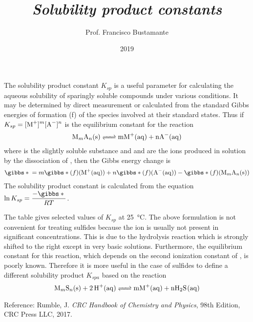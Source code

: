 \documentclass[a4paper, 10pt]{article}
\author{Prof. Francisco Bustamante}
\title{\textit{Solubility product constants}}
\date{2019}
\begin{document}
\small

\twocolumn

The solubility product constant $K_{sp}$ is a useful parameter for calculating the aqueous solubility of sparingly soluble compounds under various conditions. It may be determined by direct measurement or calculated from the standard Gibbs energies of formation \gibbs*(f){} of the species involved at their standard states. Thus if $K_{sp} = \ce{[M+]^m[A^-]^n}$ is the equilibrium constant for the reaction
\begin{align*}
    \ce{M_mA_n(s) <=> mM+(aq) + nA-(aq)}
\end{align*}
where  is the slightly soluble substance and  and  are the ions produced in solution by the dissociation of , then the Gibbs energy change is
\begin{align*}
    \gibbs*{} = m\gibbs*(f){}(\ce{M+(aq)}) + n\gibbs*(f){}(\ce{A-(aq)}) - \gibbs*(f){}(\ce{M_mA_n(s)})
\end{align*}
The solubility product constant is calculated from the equation $\ln K_{sp} = \dfrac{-\gibbs*{}}{RT}$.

The table gives selected values of $K_{sp}$ at \SI{25}{\celsius}. The above formulation is not convenient for treating sulfides because the  ion is usually not present in significant concentrations. This is due to the hydrolysis reaction  which is strongly shifted to the right except in very basic solutions. Furthermore, the equilibrium constant for this reaction, which depends on the second ionization constant of , is poorly known. Therefore it is more useful in the case of sulfides to define a different solubility product $K_{spa}$ based on the reaction
\begin{align*}
    \ce{M_mS_n(s) + 2H+(aq) <=> mM+(aq) + nH2S(aq)}
\end{align*}

Reference: Rumble, J. \textit{CRC Handbook of Chemistry and Physics}, 98th Edition, CRC Press LLC, 2017.

\end{document}
